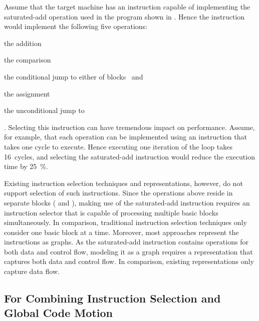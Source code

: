 Assume that the \gls{target machine} has an instruction capable of implementing
the saturated-add \gls{operation} used in the \gls{program} shown in
.
%
Hence the \gls{instruction} would implement the following five
\glspl{operation}:%
%
\begin{inlinelist}[itemjoin={, }, itemjoin*={, and}]
  \item the  addition
  \item the  comparison
  \item the conditional jump to either of blocks~ and~
  \item the  assignment
  \item the unconditional jump to~
\end{inlinelist}.
%
Selecting this \gls{instruction} can have tremendous impact on performance.
%
Assume, for example, that each \gls{operation} can be implemented using an
\gls{instruction} that takes one cycle to execute.
%
Hence executing one iteration of the loop takes \num{16}~cycles, and selecting
the saturated-add \gls{instruction} would reduce the execution time by
\SI{25}{\percent}.

Existing \gls{instruction selection} techniques and representations, however, do
not support selection of such \glspl{instruction}.
%
Since the \glspl{operation} above reside in separate \glspl{block}
( and ), making use of the saturated-add
\gls{instruction} requires an \gls{instruction selector} that is capable of
processing multiple \glspl{basic block} simultaneously.
%
In comparison, traditional \gls{instruction selection} techniques only consider
one \gls{basic block} at a time.
%
Moreover, most approaches represent the \glspl{instruction} as \glspl{graph}.
%
As the saturated-add \gls{instruction} contains \glspl{operation} for both data
and control flow, modeling it as a \gls{graph} requires a representation that
captures both data and control flow.
%
In comparison, existing representations only capture data flow.


\subsection{For Combining Instruction Selection and Global Code Motion}

